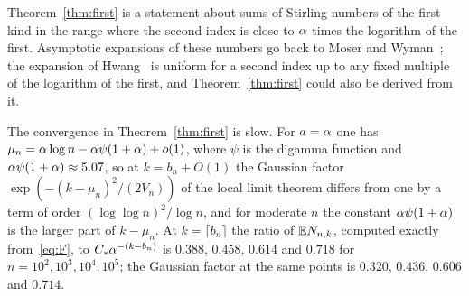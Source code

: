 \begin{remark}
Theorem~\ref{thm:first} is a statement about sums of Stirling numbers of the first kind in the range where the
second index is close to $\alpha$ times the logarithm of the first. Asymptotic expansions of these numbers go back to
Moser and Wyman~\cite{MW}; the expansion of Hwang~\cite{Hwang} is uniform for a second index up to any fixed multiple
of the logarithm of the first, and Theorem~\ref{thm:first} could also be derived from it.
\end{remark}

\begin{remark}
The convergence in Theorem~\ref{thm:first} is slow. For $a=\alpha$ one has
$\mu_n=\alpha\log n-\alpha\psi(1+\alpha)+o(1)$, where $\psi$ is the digamma function and $\alpha\psi(1+\alpha)\approx5.07$, so at
$k=b_n+O(1)$ the Gaussian factor $\exp(-(k-\mu_n)^2/(2V_n))$ of the local limit theorem differs from one by a term
of order $(\log\log n)^2/\log n$, and for moderate $n$ the constant $\alpha\psi(1+\alpha)$ is the larger part of
$k-\mu_n$. At $k=\lceil b_n\rceil$ the ratio of $\mathbb{E} N_{n,k}$, computed exactly
from~\eqref{eq:F}, to $C_*\alpha^{-(k-b_n)}$ is $0.388$, $0.458$, $0.614$ and $0.718$ for $n=10^2,10^3,10^4,10^5$; the
Gaussian factor at the same points is $0.320$, $0.436$, $0.606$ and $0.714$.
\end{remark}
